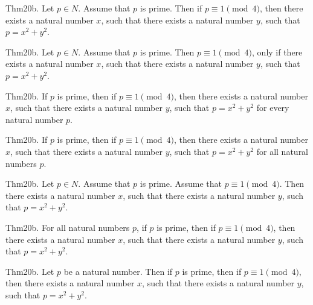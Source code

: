\documentclass{article}
\begin{document}
Thm20b. Let $p \in N$. Assume that $p$ is prime. Then if $p \equiv 1 \pmod{ 4}$, then there exists a natural number $x$, such that there exists a natural number $y$, such that $p = x ^{ 2}+ y ^{ 2}$.

Thm20b. Let $p \in N$. Assume that $p$ is prime. Then $p \equiv 1 \pmod{ 4}$, only if there exists a natural number $x$, such that there exists a natural number $y$, such that $p = x ^{ 2}+ y ^{ 2}$.

Thm20b. If $p$ is prime, then if $p \equiv 1 \pmod{ 4}$, then there exists a natural number $x$, such that there exists a natural number $y$, such that $p = x ^{ 2}+ y ^{ 2}$ for every natural number $p$.

Thm20b. If $p$ is prime, then if $p \equiv 1 \pmod{ 4}$, then there exists a natural number $x$, such that there exists a natural number $y$, such that $p = x ^{ 2}+ y ^{ 2}$ for all natural numbers $p$.

Thm20b. Let $p \in N$. Assume that $p$ is prime. Assume that $p \equiv 1 \pmod{ 4}$. Then there exists a natural number $x$, such that there exists a natural number $y$, such that $p = x ^{ 2}+ y ^{ 2}$.

Thm20b. For all natural numbers $p$, if $p$ is prime, then if $p \equiv 1 \pmod{ 4}$, then there exists a natural number $x$, such that there exists a natural number $y$, such that $p = x ^{ 2}+ y ^{ 2}$.

Thm20b. Let $p$ be a natural number. Then if $p$ is prime, then if $p \equiv 1 \pmod{ 4}$, then there exists a natural number $x$, such that there exists a natural number $y$, such that $p = x ^{ 2}+ y ^{ 2}$.
\end{document}
